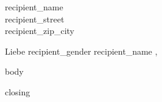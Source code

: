 \documentclass[11pt]{scrlttr2}
\begin{document}
\begin{letter}{{{ recipient_name }}\\{{{ recipient_street }}}\\{{{ recipient_zip_city }}}}
\opening{Liebe{{ recipient_gender }} {{{ recipient_name }}},}

{{{ body }}}

{{{ closing }}}

\end{letter}
\end{document}
